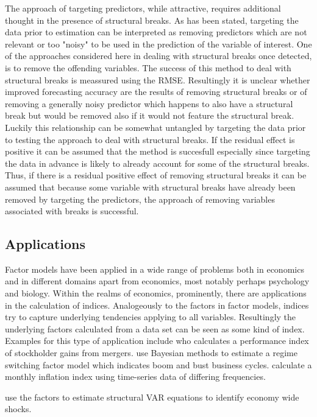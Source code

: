 \documentclass[12pt]{article}
\begin{document}
The approach of targeting predictors, while attractive, requires additional thought in the presence of structural breaks. As has been stated, targeting the data prior to estimation can be interpreted as removing predictors which are not relevant or too "noisy" to be used in the prediction of the variable of interest. One of the approaches considered here in dealing with structural breaks once detected, is to remove the offending variables. The success of this method to deal with structural breaks is meassured using the RMSE. Resultingly it is unclear whether improved forecasting accuracy are the results of removing structural breaks or of removing a generally noisy predictor which happens to also have a structural break but would be removed also if it would not feature the structural break. Luckily this relationship can be somewhat untangled by targeting the data prior to testing the approach to deal with structural breaks. If the residual effect is positive it can be assumed that the method is succesfull especially since targeting the data in advance is likely to already account for some of the structural breaks. Thus, if there is a residual positive effect of removing structural breaks it can be assumed that because some variable with structural breaks have already been removed by targeting the predictors, the approach of removing variables associated with breaks is successful.



\subsection{Applications}
Factor models have been applied in a wide range of problems both in economics and in different domains apart from economics, most notably perhaps psychology and biology. Within the realms of economics, prominently, there are applications in the calculation of indices. Analogeously to the factors in factor models, indices try to capture underlying tendencies applying to all variables. Resultingly the underlying factors calculated from a data set can be seen as some kind of index. Examples for this type of application include \citet{langetieg1978application} who calculates a performance index of stockholder gains from mergers. \citet{kim1998business} use Bayesian methods to estimate a regime switching factor model which indicates boom and bust business cycles. \citet{altissimo2001eurocoin} calculate a monthly inflation index using time-series data of differing frequencies.


\citet{forni1998let} use the factors to estimate structural VAR equations to identify economy wide shocks.
\end{document}
